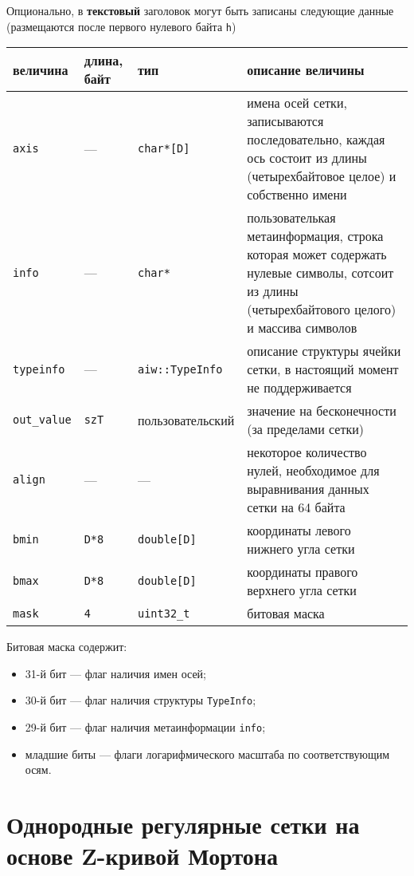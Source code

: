 \documentclass[12pt]{article}
\begin{document}
Опционально, в {\bf текстовый} заголовок могут быть записаны следующие данные (размещаются после первого нулевого байта {\tt h})
\begin{center}
\begin{tabular}{|p{}|p{}|p{}|p{}|}
\hline
величина & длина, байт & тип & описание величины \\
\hline
  {\tt axis} & --- & {\tt char*[D]} & имена осей сетки, записываются последовательно, каждая ось состоит из длины (четырехбайтовое целое) и собственно имени\\
  {\tt info} & --- & {\tt char*} &  пользователькая метаинформация, строка которая может содержать нулевые символы, сотсоит из длины (четырехбайтового целого) и массива символов\\
  {\tt typeinfo} & --- & {\tt aiw::TypeInfo} & описание структуры ячейки сетки, в настоящий момент не поддерживается \\
  {\tt out\_value} & {\tt szT} & пользовательский & значение на бесконечности (за пределами сетки) \\
  {\tt align} & --- & --- & некоторое количество нулей, необходимое для выравнивания данных сетки на 64 байта \\
  {\tt bmin} & {\tt D*8} & {\tt double[D]} & координаты левого нижнего угла сетки \\
  {\tt bmax} & {\tt D*8} & {\tt double[D]} & координаты правого верхнего угла сетки \\
  {\tt mask} & {\tt 4} & {\tt uint32\_t} & битовая маска \\  
  \hline
\end{tabular}
\end{center}
Битовая маска содержит:
\begin{itemize}
  \item 31-й бит --- флаг наличия имен осей;
  \item 30-й бит --- флаг наличия структуры {\tt TypeInfo};
  \item 29-й бит --- флаг наличия метаинформации {\tt info};
  \item младшие биты --- флаги логарифмического масштаба по соответствующим осям.
\end{itemize}


\section{Однородные регулярные сетки на основе Z-кривой Мортона}
\end{document}
